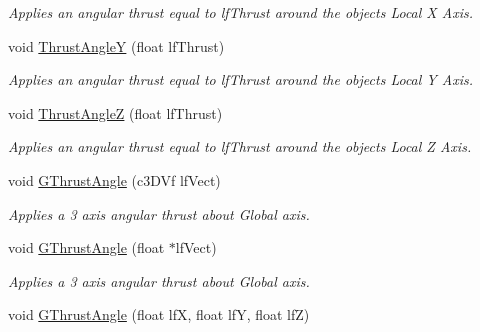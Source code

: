 \begin{DoxyCompactItemize}
\begin{DoxyCompactList}\small\item\em Applies an angular thrust equal to lfThrust around the objects Local X Axis. \end{DoxyCompactList}\item 
\hypertarget{classc_momentum_aa1356ba99d9cd0150b2ad52858a1f827}{
void \hyperlink{classc_momentum_aa1356ba99d9cd0150b2ad52858a1f827}{ThrustAngleY} (float lfThrust)}
\label{classc_momentum_aa1356ba99d9cd0150b2ad52858a1f827}

\begin{DoxyCompactList}\small\item\em Applies an angular thrust equal to lfThrust around the objects Local Y Axis. \end{DoxyCompactList}\item 
\hypertarget{classc_momentum_abaf5e48af42bb5a865145297af403eaa}{
void \hyperlink{classc_momentum_abaf5e48af42bb5a865145297af403eaa}{ThrustAngleZ} (float lfThrust)}
\label{classc_momentum_abaf5e48af42bb5a865145297af403eaa}

\begin{DoxyCompactList}\small\item\em Applies an angular thrust equal to lfThrust around the objects Local Z Axis. \end{DoxyCompactList}\item 
\hypertarget{classc_momentum_a91707ca7d1a16c9a79f4023c6f99bb60}{
void \hyperlink{classc_momentum_a91707ca7d1a16c9a79f4023c6f99bb60}{GThrustAngle} (c3DVf lfVect)}
\label{classc_momentum_a91707ca7d1a16c9a79f4023c6f99bb60}

\begin{DoxyCompactList}\small\item\em Applies a 3 axis angular thrust about Global axis. \end{DoxyCompactList}\item 
\hypertarget{classc_momentum_a831603670d8ffcb21b47ce5efcb6fe4a}{
void \hyperlink{classc_momentum_a831603670d8ffcb21b47ce5efcb6fe4a}{GThrustAngle} (float $\ast$lfVect)}
\label{classc_momentum_a831603670d8ffcb21b47ce5efcb6fe4a}

\begin{DoxyCompactList}\small\item\em Applies a 3 axis angular thrust about Global axis. \end{DoxyCompactList}\item 
\hypertarget{classc_momentum_a4d0ceb36e5d2a06a2419328e2f87ad24}{
void \hyperlink{classc_momentum_a4d0ceb36e5d2a06a2419328e2f87ad24}{GThrustAngle} (float lfX, float lfY, float lfZ)}
\label{classc_momentum_a4d0ceb36e5d2a06a2419328e2f87ad24}


\end{DoxyCompactItemize}
